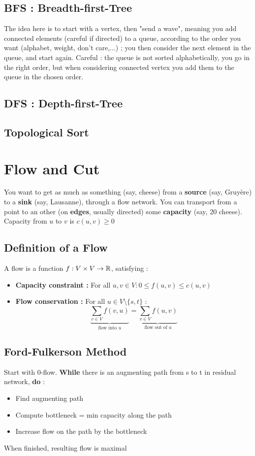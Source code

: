 \documentclass[12pt,twoside,a4paper]{article}
\begin{document}
\subsection[BFS]{BFS : Breadth-first-Tree}
The idea here is to start with a vertex, then "send a wave", meaning you add connected elements (careful if directed) to a queue, according to the order you want (alphabet, weight, don't care,...) ; you then consider the next element in the queue, and start again. Careful : the queue is not sorted alphabetically, you go in the right order, but when considering connected vertex you add them to the queue in the chosen order.
\subsection[DFS]{DFS : Depth-first-Tree}

\subsection{Topological Sort}

\section{Flow and Cut}
You want to get as much as something (say, cheese) from a \textbf{source} (say, Gruyère) to a \textbf{sink} (say, Lausanne), through a flow network. You can transport from a point to an other (on \textbf{edges}, usually directed) some \textbf{capacity} (say, 20 cheese). Capacity from $u$ to $v$ is $c(u,v) \geq 0$

\subsection{Definition of a Flow}
A flow is a function $f: V \times V \to \mathbb{R}$, satisfying :
\begin{itemize}
	\item 	\textbf{Capacity constraint :} For all $u,v \in V : 0 \leq f(u,v) \leq c(u,v)$
	\item 	\textbf{Flow conservation :} For all $u \in V \setminus \{s,t\}$ :
	\[\underbrace{\sum_{v\in V} f(v,u)}_{\text{flow into }u} = \underbrace{\sum_{v\in V} f(u,v)}_{\text{flow out of }u}\]
\end{itemize}

\subsection{Ford-Fulkerson Method}
Start with 0-flow. \textbf{While} there is an augmenting path from s to t in residual network, \textbf{do} :
\begin{itemize}
	 \item 	Find augmenting path
	 \item 	Compute bottleneck = min capacity along the path
	 \item 	Increase flow on the path by the bottleneck
\end{itemize}
When finished, resulting flow is maximal
\end{document}
